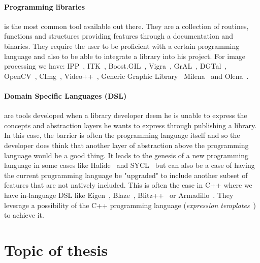 \paragraph{Programming libraries} is the most common tool available out there. They are a collection of routines,
functions and structures providing features through a documentation and binaries. They require the user to be proficient
with a certain programming language and also to be able to integrate a library into his project. For image processing we
have: IPP~\parencite{taylor.2004.intel}, ITK~\parencite{johnson.2013.ITKSoftwareGuideThirdEdition},
Boost.GIL~\parencite{bourdev.2006.bgil}, Vigra~\parencite{kothe.2011.generic}, GrAL~\parencite{berti.2006.gral},
DGTal~\parencite{coeurjolly.2016.dgtal}, OpenCV~\parencite{bradski.2000.opencv}, CImg~\parencite{tschumperle.2012.cimg},
Video++~\parencite{garrigues.2014.video++}, Generic Graphic Library~\parencite{kolas.2000.gegl}
Milena~\parencite{levillain.2009.ismm,levillain.2010.icip} and
Olena~\parencite{olena.2000.www,levillain.2011.phd,geraud.2012.hdr,levillain.2014.ciarp}.

\paragraph{Domain Specific Languages (DSL)} are tools developed when a library developer deem he is unable to express
the concepts and abstraction layers he wants to express through publishing a library. In this case, the barrier is often
the programming language itself and so the developer does think that another layer of abstraction above the programming
language would be a good thing. It leads to the genesis of a new programming language in some cases like
Halide~\parencite{ragankelley.2013.halide} and SYCL~\parencite{brown.2019.heterogeneous,wong.2019.heterogeneous} but can
also be a case of having the current programming language be "upgraded" to include another subset of features that are
not natively included. This is often the case in C++ where we have in-language DSL like
Eigen~\cite{guennebaud.2010.eigen}, Blaze~\cite{iglberger.2012.blaze,iglberger.2012_1.blaze},
Blitz++~\cite{veldhuizen.2000.blitz} or Armadillo~\cite{sanderson.2016.armadillo}. They leverage a possibility of the
C++ programming language (\emph{expression templates}~\cite{veldhuizen.1995.expression}) to achieve it.


\section*{Topic of thesis}

